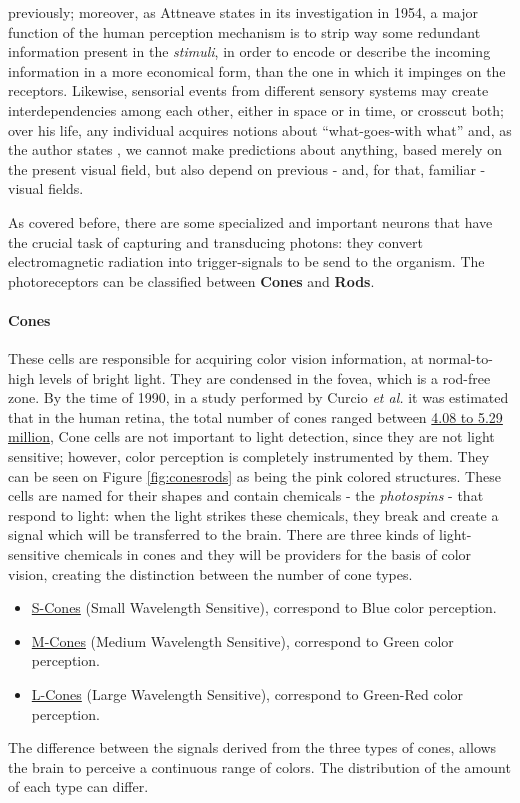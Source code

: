 previously; moreover, as Attneave \cite{Attneave1954} states in its investigation in 1954, a major function of
the human perception mechanism is to strip way some redundant information present in the \emph{stimuli},
in order to encode or describe the incoming information in a more economical form, than the one in which
it impinges on the receptors. Likewise, sensorial events from different sensory systems may create
interdependencies among each other, either in space or in time, or crosscut both; over his life, any
individual acquires notions about “what-goes-with what” and, as the author states \cite{Attneave1954}, we cannot make
predictions about anything, based merely on the present visual field, but also depend on previous - and,
for that, familiar - visual fields. \par
As covered before, there are some specialized and important neurons
that have the crucial task of capturing and transducing photons: they convert electromagnetic radiation
into trigger-signals to be send to the organism.
The photoreceptors can be classified between \textbf{Cones} and \textbf{Rods}. \par
%
\paragraph{Cones}
%
These cells are responsible for acquiring color vision information, at normal-to-high levels of bright
light. They are condensed in the fovea, which is a rod-free zone. By the time of 1990, in a study performed
by Curcio \emph{et al.} \cite{Curcio1990} it was estimated that in the human retina, the total number of cones ranged
between \underline{4.08 to 5.29 million}, Cone cells are not important to light detection, since they are not light
sensitive; however, color perception is completely instrumented by them. They can be seen on Figure \ref{fig:conesrods} as
being the pink colored structures.
These cells are named for their shapes and contain chemicals - the \emph{photospins} - that respond to light: when the
light strikes these chemicals, they break and create a signal which will be transferred to the brain.
There are three kinds of light-sensitive chemicals in cones and they will be providers for the basis
of color vision, creating the distinction between the number of cone types.
%
\begin{itemize}
\item \underline{S-Cones} (Small Wavelength Sensitive), correspond to Blue color perception.
\item \underline{M-Cones} (Medium Wavelength Sensitive), correspond to Green color perception.
\item \underline{L-Cones} (Large Wavelength Sensitive), correspond to Green-Red color perception.
\end{itemize} \par
%
The difference between the signals derived from the three types of cones, allows the brain to perceive a
continuous range of colors. The distribution of the amount of each type can differ.
%

